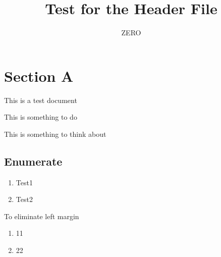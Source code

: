 


\title{Test for the Header File}
\author{ZERO}

\maketitle

\section{Section A}
This is a test document

\begin{todobox}
  This is something to do
\end{todobox}

\begin{thoughts}
  This is something to think about
\end{thoughts}

\subsection{Enumerate}
\begin{enumerate}[label=(TR\arabic*)]
\item Test1
\item Test2
\end{enumerate}

To eliminate left margin
\begin{rmk}
  \begin{enumerate}[left=0pt]
  \item 11
  \item 22
  \end{enumerate}
\end{rmk}
